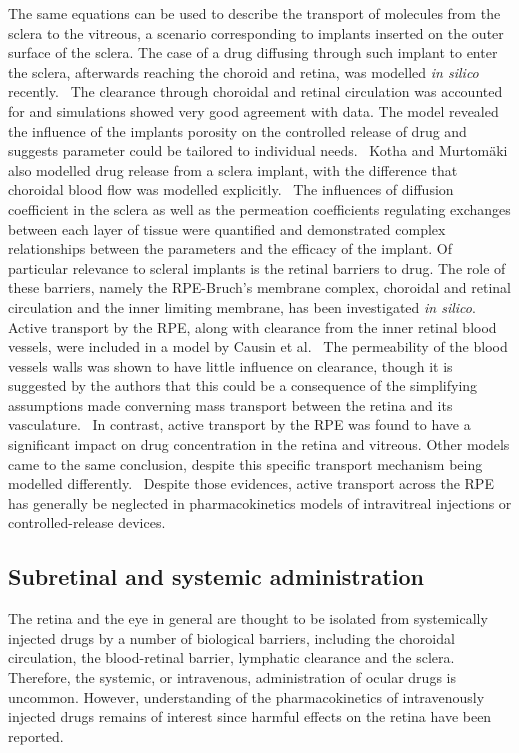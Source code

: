 \documentclass[12pt,a4paper]{journal}
\begin{document}
The same equations can be used to describe the transport of molecules from the sclera to the vitreous, a scenario corresponding to implants inserted on the outer surface of the sclera.
The case of a drug diffusing through such implant to enter the sclera, afterwards reaching the choroid and retina, was modelled \textit{in silico} recently.~\cite{Abootorabi_2021}
The clearance through choroidal and retinal circulation was accounted for and simulations showed very good agreement with data.
The model revealed the influence of the implants porosity on the controlled release of drug and suggests parameter could be tailored to individual needs.~\cite{Abootorabi_2021}
Kotha and Murtom\"aki also modelled drug release from a sclera implant, with the difference that choroidal blood flow was modelled explicitly.~\cite{Kotha_2014}
The influences of diffusion coefficient in the sclera as well as the permeation coefficients regulating exchanges between each layer of tissue were quantified and demonstrated complex relationships between the parameters and the efficacy of the implant.
Of particular relevance to scleral implants is the retinal barriers to drug.
The role of these barriers, namely the RPE-Bruch's membrane complex, choroidal and retinal circulation and the inner limiting membrane, has been investigated \textit{in silico}.
Active transport by the RPE, along with clearance from the inner retinal blood vessels, were included in a model by Causin et al.~\cite{Causin_2016}
The permeability of the blood vessels walls was shown to have little influence on clearance, though it is suggested by the authors that this could be a consequence of the simplifying assumptions made converning mass transport between the retina and its vasculature.~\cite{Causin_2016}
In contrast, active transport by the RPE was found to have a significant impact on drug concentration in the retina and vitreous.
Other models came to the same conclusion, despite this specific transport mechanism being modelled differently.~\cite{Balachandran_2008,Kotha_2014}
Despite those evidences, active transport across the RPE has generally be neglected in pharmacokinetics models of intravitreal injections or controlled-release devices.


\subsection*{Subretinal and systemic administration}

The retina and the eye in general are thought to be isolated from systemically injected drugs by a number of biological barriers, including the choroidal circulation, the blood-retinal barrier, lymphatic clearance and the sclera.
Therefore, the systemic, or intravenous, administration of ocular drugs is uncommon.
However, understanding of the pharmacokinetics of intravenously injected drugs remains of interest since harmful effects on the retina have been reported.\cite{Fu_2017}
\end{document}
